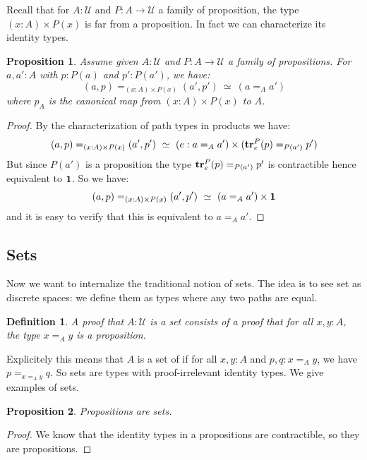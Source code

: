 \documentclass{article}
\newcommand{\sse}[1]{\medbreak \subsection{#1}}
\newcommand{\U}{{\mathcal U}}
\renewcommand{\r}{\rightarrow}
\newcommand{\tr}{\mathrm{\bf tr}}
\newcommand{\one}{{\bf 1}}
\newtheorem{definition}{Definition}
\newtheorem{proposition}{Proposition}
\begin{document}
Recall that for $A:\U$ and $P:A\r \U$ a family of proposition, the type $(x:A)\times P(x)$ is far from a proposition. In fact we can characterize its identity types.

\begin{proposition}
Assume given $A:\U$ and $P:A\r \U$ a family of propositions. For $a,a':A$ with $p:P(a)$ and $p':P(a')$, we have:
\[(a,p)=_{(x:A)\times P(x)} (a',p')\ \simeq \ (a=_Aa')\]
where $p_A$ is the canonical map from $(x:A)\times P(x)$ to $A$.
\end{proposition}
\begin{proof}
By the characterization of path types in products we have:
\[(a,p)=_{(x:A)\times P(x)} (a',p')\ \simeq \ (e:a=_Aa')\times(\tr^P_e(p) =_{P(a')} p') \]
But since $P(a')$ is a proposition the type $\tr^P_e(p) =_{P(a')} p'$ is contractible hence equivalent to $\one$. So we have:
\[(a,p)=_{(x:A)\times P(x)} (a',p')\ \simeq \ (a=_Aa')\times \one\]
and it is easy to verify that this is equivalent to $a=_Aa'$.
\end{proof}






\sse{Sets}

Now we want to internalize the traditional notion of sets. The idea is to see set as discrete spaces: we define them as types where any two paths are equal.

\begin{definition}
A proof that $A:\U$ is a set consists of a proof that for all $x,y:A$, the type $x=_A y$ is a proposition.
\end{definition}

Explicitely this means that $A$ is a set of if for all $x,y:A$ and $p,q:x=_Ay$, we have $p=_{x=_Ay} q$. So sets are types with proof-irrelevant identity types. We give examples of sets.

\begin{proposition}
Propositions are sets.
\end{proposition}
\begin{proof}
We know that the identity types in a propositions are contractible, so they are propositions.
\end{proof}
\end{document}
